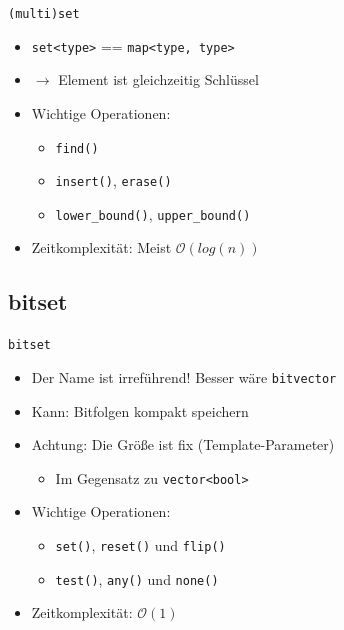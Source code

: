 \begin{frame}{\texttt{(multi)set}}
	\begin{itemize}
		\item \texttt{set<type>} == \texttt{map<type, type>}
		\item[] $\rightarrow$ Element ist gleichzeitig Schlüssel
		\pause
		\item Wichtige Operationen:
		\begin{itemize}
			\item \texttt{find()}
			\item \texttt{insert()}, \texttt{erase()}
			\item \texttt{lower\_bound()}, \texttt{upper\_bound()}
		\end{itemize}
		\pause
		\item Zeitkomplexität: Meist $\mathcal{O}(log(n))$
	\end{itemize}
\end{frame}

\subsection{bitset}

\begin{frame}{\texttt{bitset}}
	\begin{itemize}
		\item Der Name ist irreführend! Besser wäre \texttt{bitvector}
		\item Kann: Bitfolgen kompakt speichern
		\item Achtung: Die Größe ist fix (Template-Parameter)
		\begin{itemize}
			\item Im Gegensatz zu \texttt{vector<bool>}
		\end{itemize}
		\pause
		\item Wichtige Operationen:
		\begin{itemize}
			\item \texttt{set()}, \texttt{reset()} und \texttt{flip()}
			\item \texttt{test()}, \texttt{any()} und \texttt{none()}
		\end{itemize}
		\item Zeitkomplexität: $\mathcal{O}(1)$
	\end{itemize}
\end{frame}

